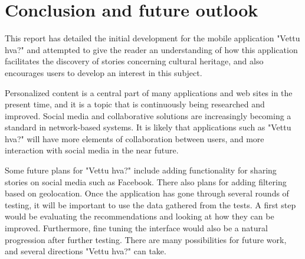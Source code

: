 
\chapter{Conclusion and future outlook}

This report has detailed the initial development for the mobile application "Vettu hva?" and attempted to give the reader an understanding of how this application facilitates the discovery of stories concerning cultural heritage, and also encourages users to develop an interest in this subject.\newline

Personalized content is a central part of many applications and web sites in the present time, and it is a topic that is continuously being researched and improved. Social media and collaborative solutions are increasingly becoming a standard in network-based systems. It is likely that applications such as "Vettu hva?" will have more elements of collaboration between users, and more interaction with social media in the near future.\newline

Some future plans for "Vettu hva?" include adding functionality for sharing stories on social media such as Facebook. There also plans for adding filtering based on geolocation. Once the application has gone through several rounds of testing, it will be important to use the data gathered from the tests. A first step would be evaluating the recommendations and looking at how they can be improved. Furthermore, fine tuning the interface would also be a natural progression after further testing. There are many possibilities for future work, and several directions "Vettu hva?" can take.


\cleardoublepage